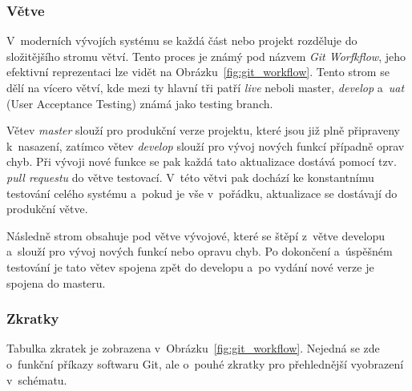 \subsubsection*{Větve}
\label{subsubsec:implementation-collaboration-versioning-branches}
V~moderních vývojích systému se každá část nebo projekt rozděluje do složitějšího stromu větví. Tento proces je známý pod názvem \textit{Git Worfkflow}, jeho efektivní reprezentaci lze vidět na Obrázku~\ref{fig:git_workflow}. Tento strom se dělí na vícero větví, kde mezi ty hlavní tři patří \textit{live} neboli master, \textit{develop} a~\textit{uat} (User Acceptance Testing) známá jako testing branch.

Větev \textit{master} slouží pro produkční verze projektu, které jsou již plně připraveny k~nasazení, zatímco větev \textit{develop} slouží pro vývoj nových funkcí případně oprav chyb. Při vývoji nové funkce se pak každá tato aktualizace dostává pomocí tzv. \textit{pull requestu} do větve testovací. V~této větvi pak dochází ke konstantnímu testování celého systému a~pokud je vše v~pořádku, aktualizace se dostávají do produkční větve.

Následně strom obsahuje pod větve vývojové, které se štěpí z~větve developu a~slouží pro vývoj nových funkcí nebo opravu chyb. Po dokončení a~úspěšném testování je tato větev spojena zpět do developu a~po vydání nové verze je spojena do masteru.

\subsubsection*{Zkratky}
Tabulka zkratek je zobrazena v~Obrázku~\ref{fig:git_workflow}. Nejedná se zde o~funkční příkazy softwaru Git, ale o~pouhé zkratky pro přehlednější vyobrazení v~schématu.

